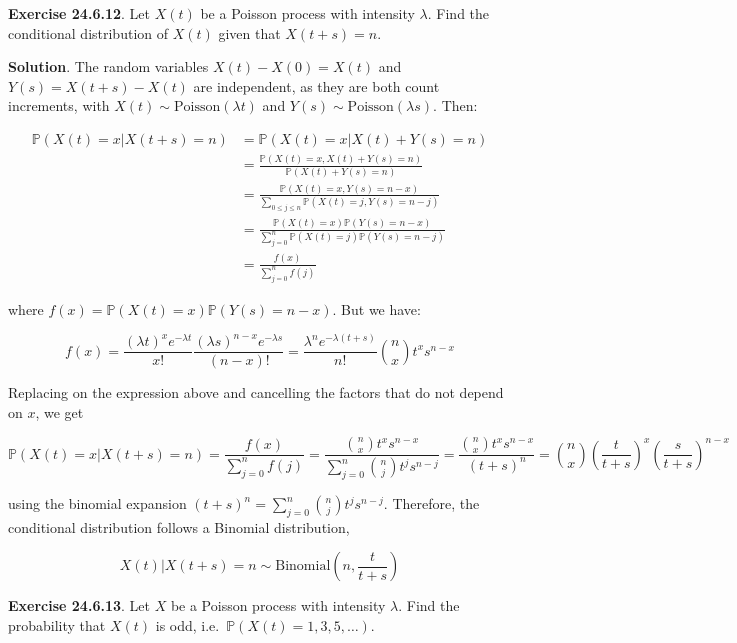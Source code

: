 \textbf{Exercise 24.6.12}. Let \(X(t)\) be a Poisson process with
intensity \(\lambda\). Find the conditional distribution of \(X(t)\)
given that \(X(t + s) = n\).

\textbf{Solution}. The random variables \(X(t) - X(0) = X(t)\) and
\(Y(s) = X(t + s) - X(t)\) are independent, as they are both count
increments, with \(X(t) \sim \text{Poisson}(\lambda t)\) and
\(Y(s) \sim \text{Poisson}(\lambda s)\). Then:

\[ 
\begin{align}
\mathbb{P}\left(X(t) = x | X(t + s) = n\right) &= \mathbb{P}\left(X(t) = x | X(t) + Y(s) = n\right) \\
&= \frac{\mathbb{P}\left(X(t) = x, X(t) + Y(s) = n\right)}{\mathbb{P}\left(X(t) + Y(s) = n\right)} \\
&= \frac{\mathbb{P}\left(X(t) = x, Y(s) = n - x\right)}{\sum_{0 \leq j \leq n} \mathbb{P}\left(X(t) = j, Y(s) = n - j\right)} \\
&= \frac{\mathbb{P}\left(X(t) = x\right) \mathbb{P}\left(Y(s) = n - x\right)}{\sum_{j=0}^n \mathbb{P}\left(X(t) = j\right) \mathbb{P}\left( Y(s) = n - j\right)} \\
&= \frac{f(x)}{\sum_{j=0}^n f(j) }
\end{align}
\]

where
\(f(x) = \mathbb{P}\left(X(t) = x\right) \mathbb{P}\left( Y(s) = n - x\right)\).
But we have:

\[ f(x) = \frac{(\lambda t)^x e^{-\lambda t}}{x!}\frac{(\lambda s)^{n - x} e^{-\lambda s}}{(n - x)!} = \frac{\lambda^n e^{-\lambda (t + s)}}{n!} \binom{n}{x} t^x s^{n - x} \]

Replacing on the expression above and cancelling the factors that do not
depend on \(x\), we get

\[ \mathbb{P}\left(X(t) = x | X(t + s) = n\right) = \frac{f(x)}{\sum_{j=0}^n f(j) } = \frac{\binom{n}{x} t^x s^{n - x}}{\sum_{j=0}^n \binom{n}{j} t^j s^{n - j}} 
= \frac{\binom{n}{x} t^x s^{n - x}}{(t + s)^n} = \binom{n}{x} \left( \frac{t}{t + s} \right)^x \left( \frac{s}{t + s}\right)^{n - x}\]

using the binomial expansion
\((t + s)^n = \sum_{j=0}^n \binom{n}{j} t^j s^{n - j}\). Therefore, the
conditional distribution follows a Binomial distribution,

\[ X(t) | X(t + s) = n \sim \text{Binomial}\left(n, \frac{t}{t + s} \right)\]

\textbf{Exercise 24.6.13}. Let \(X\) be a Poisson process with intensity
\(\lambda\). Find the probability that \(X(t)\) is odd,
i.e.~\(\mathbb{P}(X(t) = 1, 3, 5, \dots)\).

